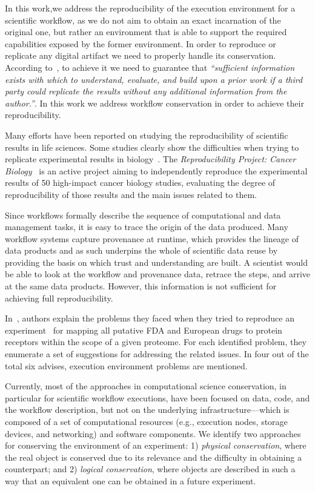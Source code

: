 In this work,we address the reproducibility of the execution environment for a scientific workflow, 
as we do not aim to obtain an exact incarnation of the original one, but rather an 
environment that is able to support the required capabilities exposed by the former 
environment. In order to reproduce or replicate any digital artifact we need to properly handle its conservation.
According to~\cite{King1995}, to achieve it we need to guarantee that {\it ``sufficient information
exists with which to understand, evaluate, and build upon a prior work if a third party could replicate
 the results without any additional information from the author.''}. In this work we address workflow conservation
 in order to achieve their reproducibility.

Many efforts have been reported on studying the reproducibility of scientific results 
in life sciences. Some studies clearly show the difficulties when trying to replicate 
experimental results in biology~\cite{Ioannidis2009}. The \emph{Reproducibility 
Project: Cancer Biology}~\cite{ErringtonCancerRerpoducibility} is an active project 
aiming to independently reproduce the experimental results of 50 high-impact cancer 
biology studies, evaluating the degree of reproducibility of those results and the main 
issues related to them.


Since workflows formally describe the sequence of computational and data 
management tasks, it is easy to trace the origin of the data produced. Many workflow 
systems capture provenance at runtime, which provides the lineage of data products 
and as such underpins the whole of scientific data reuse by providing the basis on which 
trust and understanding are built. A scientist would be able to look at the workflow and 
provenance data, retrace the steps, and arrive at the same data products. 
However, this information is not sufficient for achieving full reproducibility.

In~\cite{Garijo2013}, authors explain the problems they faced when they tried to 
reproduce an experiment~\cite{drugomePrimer} for mapping all putative FDA 
and European drugs to protein receptors within the scope of a given proteome. For 
each identified problem, they enumerate a set of suggestions for addressing the related
issues. In four out of the total six advises, execution environment problems are mentioned.

Currently, most of the approaches in computational science conservation, in particular 
for scientific workflow executions, have been focused on data, code, and the workflow 
description, but not on the underlying infrastructure---which is composed of a set of 
computational resources (e.g., execution nodes, storage devices, and networking) and 
software components. We identify two approaches for conserving the environment of an 
experiment: 1) \emph{physical conservation}, where the real object is conserved due to 
its relevance and the difficulty in obtaining a counterpart; and 2) \emph{logical conservation}, 
where objects are described in such a way that an equivalent one can be obtained in a 
future experiment.


